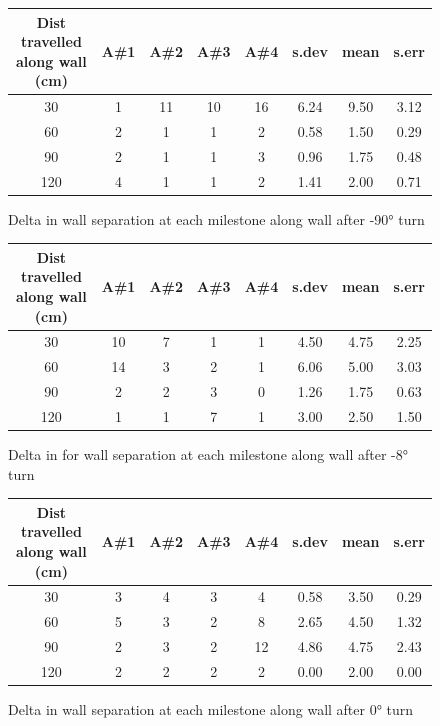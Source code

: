 \documentclass[a4paper,12pt]{article}
\begin{document}
\begin{figure}[ht]
\begin{tabular}{c c c c c c c c} %
\hline\hline %
Dist travelled along wall (cm) & A\#1 & A\#2 & A\#3 & A\#4 & s.dev & mean & s.err \\ [0.5ex] %
\hline %
30 & 1 & 11 & 10 & 16 & 6.24 & 9.50 & 3.12\\
60 & 2 & 1 & 1 & 2 & 0.58 & 1.50 & 0.29\\
90 & 2 & 1 & 1 & 3 & 0.96 & 1.75 & 0.48\\
120 & 4 & 1 & 1 & 2 & 1.41 & 2.00 & 0.71\\ [1ex] %
\hline %
\end{tabular}
\caption{Delta in wall separation at each milestone along wall after \ang{-90} turn}
\label{fig:derivm90}
\end{figure}

\begin{figure}[ht]
\begin{tabular}{c c c c c c c c} %
\hline\hline %
Dist travelled along wall (cm) & A\#1 & A\#2 & A\#3 & A\#4 & s.dev & mean & s.err \\ [0.5ex] %
\hline %
30 & 10 & 7 & 1 & 1 & 4.50 & 4.75 & 2.25\\
60 & 14 & 3 & 2 & 1 & 6.06 & 5.00 & 3.03\\
90 & 2 & 2 & 3 & 0 & 1.26 & 1.75 & 0.63\\
120 & 1 & 1 & 7 & 1 & 3.00 & 2.50 & 1.50\\ [1ex] %
\hline %
\end{tabular}
\caption{Delta in for wall separation at each milestone along wall after \ang{-8} turn}
\label{fig:derivm8}
\end{figure}

\begin{figure}[ht]
\begin{tabular}{c c c c c c c c} %
\hline\hline %
Dist travelled along wall (cm) & A\#1 & A\#2 & A\#3 & A\#4 & s.dev & mean & s.err \\ [0.5ex] %
\hline %
30 & 3 & 4 & 3 & 4 & 0.58 & 3.50 & 0.29\\
60 & 5 & 3 & 2 & 8 & 2.65 & 4.50 & 1.32\\
90 & 2 & 3 & 2 & 12 & 4.86 & 4.75 & 2.43\\
120 & 2 & 2 & 2 & 2 & 0.00 & 2.00 & 0.00\\ [1ex] %
\hline %
\end{tabular}
\caption{Delta in wall separation at each milestone along wall after \ang{0} turn}
\label{fig:deriv0}
\end{figure}
\end{document}
